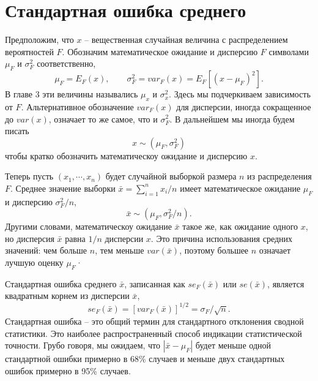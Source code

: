 \section{Стандартная ошибка среднего}

Предположим, что $x$ -- вещественная случайная величина с распределением вероятностей $F$. Обозначим математическое ожидание и дисперсию $F$ символами $\mu_F$ и $\sigma^2_F$ соответственно,
\begin{equation}
    \mu_F=E_F(x),\qquad \sigma^2_F=var_F(x)=E_F[(x-\mu_F)^2].
\end{equation}
В главе 3 эти величины назывались $\mu_x$ и $\sigma^2_x$. Здесь мы подчеркиваем зависимость от $F$. Альтернативное обозначение $var_F (x)$ для дисперсии, иногда сокращенное до $var (x)$, означает то же самое, что и $\sigma^2_F$. В дальнейшем мы иногда будем писать
\begin{equation}
    x\sim(\mu_F,\sigma^2_F)
\end{equation}
чтобы кратко обозначить математическоу ожидание и дисперсию $x$.

Теперь пусть $(x_1,\cdots, x_n)$ будет случайной выборкой размера $n$ из распределения $F$. Среднее значение выборки $\bar x = \sum_{i=1}^n x_i / n$ имеет математическое ожидание $\mu_F$ и дисперсию $\sigma^2_F/n$, 
\begin{equation}
    \bar x\sim(\mu_F,\sigma^2_F/n).
\end{equation}
Другими словами, математическоу ожидание $\bar x$ такое же, как ожидание одного $x$, но дисперсия $\bar x$ равна $1 / n$ дисперсии $x$. Это причина использования средних значений: чем больше $n$, тем меньше $var (\bar x)$, поэтому большее $n$ означает лучшую оценку $\mu_F$·

Стандартная ошибка среднего $\bar x$, записанная как $se_F (\bar x)$ или $se (\bar x)$, является квадратным корнем из дисперсии $\bar x$, 
\begin{equation}
    se_F (\bar x) = [var_F(\bar x)]^{1/2} = \sigma_F/\sqrt{n}.
\end{equation}
Стандартная ошибка -- это общий термин для стандартного отклонения сводной статистики. Это наиболее распространенный способ индикации статистической точности. Грубо говоря, мы ожидаем, что $|\bar x-\mu_F|$ будет меньше одной стандартной ошибки примерно в 68\% случаев и меньше двух стандартных ошибок примерно в 95\% случаев. 

